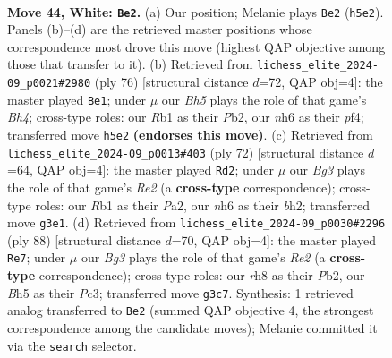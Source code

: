 \documentclass[11pt]{article}
\begin{document}
\clearpage

\begin{figure}[p]\centering
\begin{subfigure}{0.46\textwidth}\centering
\resizebox{\linewidth}{!}{%
\newchessgame
\chessboard[
  setfen={7r/p2r2kp/7n/P5bB/8/1Pp3BP/R1P3P1/1R4K1 w - - 3 44},
  showmover=false,
  pgfstyle=straightmove, color=movearrow, markmove={h5-e2}
]}
\caption{}
\end{subfigure}\hfill
\begin{subfigure}{0.46\textwidth}\centering
\resizebox{\linewidth}{!}{%
\newchessgame
\chessboard[
  setfen={1R6/7p/3n2p1/2pk1r2/5p1B/5P1P/1P4PK/8 w - - 0 39},
  showmover=false,
  pgfstyle=straightmove, color=movearrow, markmove={h4-e1}
]}
\caption{}
\end{subfigure}
\\[4pt]
\begin{subfigure}{0.46\textwidth}\centering
\resizebox{\linewidth}{!}{%
\newchessgame
\chessboard[
  setfen={8/pp1r1pk1/8/2p2nB1/2N5/2P5/PP2R1Pb/5K2 w - - 1 37},
  showmover=false,
  pgfstyle=straightmove, color=movearrow, markmove={e2-d2}
]}
\caption{}
\end{subfigure}\hfill
\begin{subfigure}{0.46\textwidth}\centering
\resizebox{\linewidth}{!}{%
\newchessgame
\chessboard[
  setfen={8/3n1rk1/6p1/p1p4p/P6P/2P3P1/1P2R1K1/4R3 w - - 0 45},
  showmover=false,
  pgfstyle=straightmove, color=movearrow, markmove={e2-e7}
]}
\caption{}
\end{subfigure}
\caption{\textbf{Move 44, White: \texttt{Be2}.} (a) Our position; Melanie plays \texttt{Be2} (\texttt{h5e2}). Panels (b)--(d) are the retrieved master positions whose correspondence most drove this move (highest QAP objective among those that transfer to it). (b) Retrieved from \texttt{lichess\_elite\_2024-09\_p0021\#2980} (ply 76) [structural distance $d$=72, QAP obj=4]: the master played \texttt{Be1}; under $\mu$ our \emph{Bh5} plays the role of that game's \emph{Bh4}; cross-type roles: our \emph{R}b1 as their \emph{P}b2, our \emph{n}h6 as their \emph{p}f4; transferred move \texttt{h5e2} \textbf{(endorses this move)}. (c) Retrieved from \texttt{lichess\_elite\_2024-09\_p0013\#403} (ply 72) [structural distance $d$=64, QAP obj=4]: the master played \texttt{Rd2}; under $\mu$ our \emph{Bg3} plays the role of that game's \emph{Re2} (a \textbf{cross-type} correspondence); cross-type roles: our \emph{R}b1 as their \emph{P}a2, our \emph{n}h6 as their \emph{b}h2; transferred move \texttt{g3e1}. (d) Retrieved from \texttt{lichess\_elite\_2024-09\_p0030\#2296} (ply 88) [structural distance $d$=70, QAP obj=4]: the master played \texttt{Re7}; under $\mu$ our \emph{Bg3} plays the role of that game's \emph{Re2} (a \textbf{cross-type} correspondence); cross-type roles: our \emph{r}h8 as their \emph{P}b2, our \emph{B}h5 as their \emph{P}c3; transferred move \texttt{g3c7}. Synthesis: 1 retrieved analog transferred to \texttt{Be2} (summed QAP objective 4, the strongest correspondence among the candidate moves); Melanie committed it via the \texttt{search} selector.}
\label{fig:thought-m86}
\end{figure}
\end{document}
